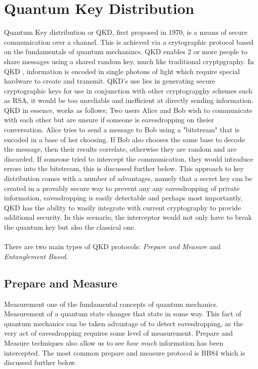 \documentclass[journal]{IEEEtran}
\begin{document}
\section{Quantum Key Distribution}
Quantum Key distribution or QKD, first proposed in 1970, is a means of secure communication over a channel. This is achieved via a crytographic protocol based on the fundamentals of quantum mechanincs.
QKD enables 2 or more people to share messages using a shared random key, much like traditional cryptpgraphy. In QKD , information is encoded in single photons of light which require special hardware to create and transmit.
QKD's use lies in generating secure cryptographic keys for use in conjunction with other cryptograpghy schemes such as RSA, it would be too unreliable and inefficient at directly sending information.
QKD in essence, works as follows; Two users Alice and Bob wish to communicate with each other but are unsure if someone is eavesdropping on theier conversation. Alice tries to send a message to Bob using a "bitstream" that is encoded in a base of 
her choosing. If Bob also chooses the same base to decode the message, then their results correlate, otherwise they are random and are discarded. If someone tried to intercept the communication, they would introduce errors into the bitstream, this is discussed further below.
This approach to key distribution comes with a number of advantages, namely that a secret key can be created in a provably secure way to prevent any any eavesdropping of private information, eavesdropping is easily detectable and perhaps most importantly, QKD has the ability to 
wasily integrate with current cryptography to provide additional security. In this scenario, the interceptor would not only have to break the quantum key but also the classical one. \\ \\
There are two main types of QKD protocols: \emph{Prepare and Measure} and \emph{Entanglement Based}.
\subsection{Prepare and Measure}
Measurement one of the fundamental concepts of quantum mechanics. Measurement of a quantum state changes that state in some way. This fact of quantum mechanics can be taken advantage of to detect eavesdropping,
as the very act of eavesdropping requires some level of measurement. Prepare and Measure techniques also allow us to see \emph{how much} information has been intercepted. The most common prepare and measure protocol is BB84 which is discussed further below.
\end{document}
